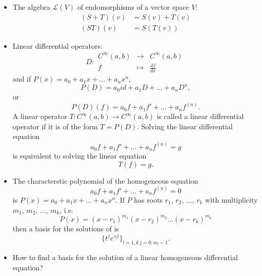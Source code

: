 \begin{itemize}
\item The algebra $\mathcal L(V)$ of endomorphisms of a vector space $V$:
\[\begin{split}
(S+T)(v) & = S(v)+T(v) \\
(ST)(v)  & = S(T(v))
\end{split}\] 
\item Linear differential operators:
\[D: \begin{array}{rcl} C^\infty (a,b) & \rightarrow & C^\infty (a,b)\\
 f & \mapsto & \frac{df}{dx} \end{array}\]
and if $P(x) = a_0 + a_1 x + ... + a_n x^n,$
\[P(D) = a_0id + a_1 D + ... + a_n D^n,\]
or 
\[P(D)(f) = a_0f + a_1 f' + ... + a_n f^{(n)}.\]
A linear operator $T:C^\infty (a,b) \rightarrow C^\infty (a,b)$ is called a linear differential operator if it is of the form $T= P(D)$. Solving the linear differential equation 
\[a_0f + a_1 f' + ... + a_n f^{(n)}= g\]
is equivalent to solving the linear equation 
\[T(f) = g.\]
\item The characterstic polynomial of the homogeneous equation
\[a_0f + a_1 f' + ... + a_n f^{(n)}= 0\]
is $P(x) = a_0 + a_1 x + ... + a_n x^n$. If $P$ has roots $r_1$, $r_2$, ..., $r_k$ with multiplicity $m_1$, $m_2$, ..., $m_k$, i.e.
\[P(x) = (x-r_1)^{m_1}(x-r_2)^{m_2}...(x-r_k)^{m_k}\]
then a basis for the solutions of is 
\[\{ t^j e^{r_l t}\}_{l= 1,k \ j= 0,m_l-1}.\]
\item How to find a basis for the solution of a linear homogeneous differential equation?
\end{itemize} 

